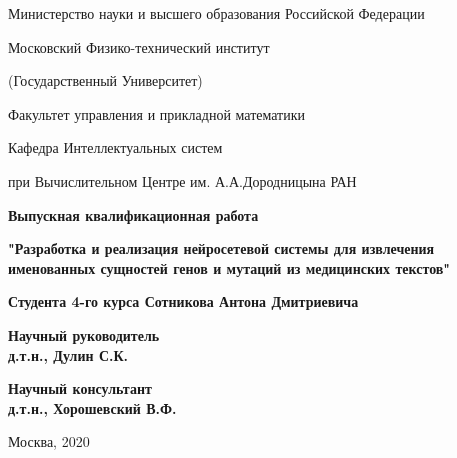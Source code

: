 \documentclass[12pt, a4paper]{article} %
\begin{document}
	
\vskip 3mm

\setcounter{page}{1}
\begin{center}
	\thispagestyle{empty}
	
	{ Министерство науки и высшего образования Российской Федерации\\}

	
	
	{ Московский Физико-технический институт \\}
	
	{ (Государственный Университет) \\}
	
	{ Факультет управления и прикладной математики  \\}
	
	{ Кафедра Интеллектуальных систем\\}
	
	{при Вычислительном Центре им. А.А.Дородницына РАН\\ [4cm]}
	
	{ \bf \Large Выпускная квалификационная работа\\}
	
	{ \bf \Large{"Разработка и реализация нейросетевой системы для извлечения именованных сущностей генов и мутаций из медицинских текстов"\\[1cm]} }
	
	{\bf {Студента 4-го курса Сотникова Антона Дмитриевича}\\[3cm]}
	
\end{center}

\begin{flushright}
	\bf{Научный руководитель}\\
	\bf{д.т.н., Дулин С.К.}\\[0.5cm]
\end{flushright}

\begin{flushright}
	\bf{Научный консультант}\\
	\bf{д.т.н., Хорошевский В.Ф.}\\[2cm]
\end{flushright}



\begin{center}
	Москва, 2020
\end{center}
\end{document}
